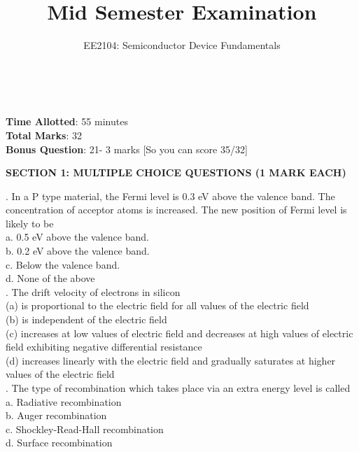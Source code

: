 \documentclass[12pt]{article}\date{}
\begin{document}
\title{Mid Semester Examination}
\maketitle
\begin{center}
\begin{large}
\author{EE2104: Semiconductor Device Fundamentals} \\[30pt]
\end{large}
\end{center} 
\textbf{Time Allotted}: 55 minutes \\
\textbf{Total Marks}: 32 \\
\textbf{Bonus Question}: 21- 3 marks [So you can score 35/32] \\[30pt]

\begin{large}
\textbf{SECTION 1: MULTIPLE CHOICE QUESTIONS (1 MARK EACH)} \\[30pt] 
\end{large}

. In a P type material, the Fermi level is 0.3 eV above the valence band. The concentration of acceptor atoms is increased. The new position of Fermi level is likely to be \\
a. 0.5 eV above the valence band. \\
b. 0.2 eV above the valence band. \\
c. Below the valence band. \\
d. None of the above \\

. The drift velocity of electrons in silicon \\
(a) is proportional to the electric field for all values of the electric field \\
(b) is independent of the electric field \\
(c) increases at low values of electric field and decreases at high values of electric field exhibiting negative differential resistance \\
(d) increases linearly with the electric field and gradually saturates at higher values of the electric field \\

. The type of recombination which takes place via an extra energy level is called \\
a. Radiative recombination \\
b. Auger recombination \\
c. Shockley-Read-Hall recombination \\
d. Surface recombination \\
\end{document}
